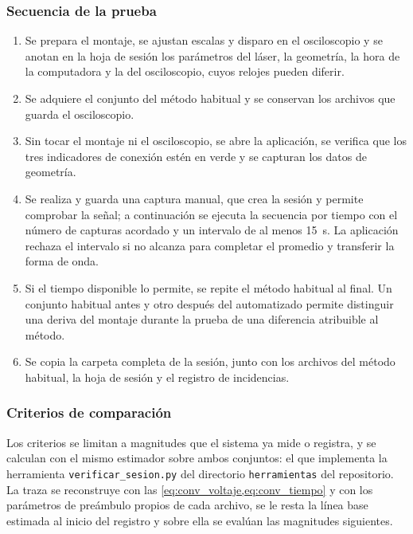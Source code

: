 \subsubsection*{Secuencia de la prueba}

\begin{enumerate}[leftmargin=*, itemsep=2pt]
  \item Se prepara el montaje, se ajustan escalas y disparo en el
    osciloscopio y se anotan en la hoja de sesión los parámetros del
    láser, la geometría, la hora de la computadora y la del
    osciloscopio, cuyos relojes pueden diferir.
  \item Se adquiere el conjunto del método habitual y se conservan los
    archivos que guarda el osciloscopio.
  \item Sin tocar el montaje ni el osciloscopio, se abre la aplicación,
    se verifica que los tres indicadores de conexión estén en verde y se
    capturan los datos de geometría.
  \item Se realiza y guarda una captura manual, que crea la sesión y
    permite comprobar la señal; a continuación se ejecuta la secuencia
    por tiempo con el número de capturas acordado y un intervalo de al
    menos \SI{15}{\second}. La aplicación rechaza el intervalo si no
    alcanza para completar el promedio y transferir la forma de onda.
  \item Si el tiempo disponible lo permite, se repite el método habitual
    al final. Un conjunto habitual antes y otro después del automatizado
    permite distinguir una deriva del montaje durante la prueba de una
    diferencia atribuible al método.
  \item Se copia la carpeta completa de la sesión, junto con los
    archivos del método habitual, la hoja de sesión y el registro de
    incidencias.
\end{enumerate}

\subsubsection*{Criterios de comparación}

Los criterios se limitan a magnitudes que el sistema ya mide o
registra, y se calculan con el mismo estimador sobre ambos conjuntos:
el que implementa la herramienta \texttt{verificar\_sesion.py} del
directorio \texttt{herramientas} del repositorio. La traza
se reconstruye con las \cref{eq:conv_voltaje,eq:conv_tiempo} y con los
parámetros de preámbulo propios de cada archivo, se le resta la línea
base estimada al inicio del registro y sobre ella se evalúan las
magnitudes siguientes.

